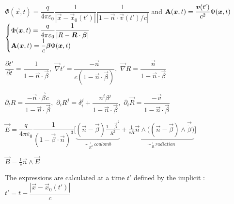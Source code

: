 \item $\Phi(\vec{x},t) = \dfrac{q}{4\pi\varepsilon_0} \dfrac{1}{|\vec{x} - \vec{x}_0(t')|} \dfrac{1}{|1- \vec{n}\cdot\vec{v}(t')/c|}$ and  $\vec{\rm{A}}(\vec{x},t) = \dfrac{\vec{v}(t')}{c^2} \Phi(\vec{x},t)$
\\
$\begin{cases}
\Phi(\vec{x},t) = \dfrac{q}{4\pi\varepsilon_0} \dfrac{1}{|R-\vec{R}\cdot\vec{\beta}|}
\\
\vec{\rm{A}}(\vec{x},t) = \dfrac{1}{c}\vec{\beta} \Phi(\vec{x},t)
\end{cases}$

\item $\dfrac{\partial t'}{\partial t} = \dfrac{1}{1-\vec{n}\cdot\vec{\beta}}, \,\, \vec{\nabla}t' = \dfrac{-\vec{n}}{c(1-\vec{n}\cdot\vec{\beta})}, \,\, \vec{\nabla}R = \dfrac{\vec{n}}{1-\vec{n}\cdot\vec{\beta}}$

\item $\partial_t R = \dfrac{-\vec{n}\cdot\vec{\beta}c}{1-\vec{n}\cdot\vec{\beta}}, \,\, \partial_i R^j = \delta_i^j + \dfrac{n^i\beta^j}{1-\vec{n}\cdot\vec{\beta}}, \,\, \partial_t \vec{R} = \dfrac{-\vec{v}}{1-\vec{n}\cdot\vec{\beta}}$


\item $\vec{E} =  \dfrac{q}{4\pi\varepsilon_0} \dfrac{1}{ (1-\vec{\beta}\cdot\vec{n})^3} \big[\underbrace{(\vec{n} - \vec{\beta})\frac{1-\vec{\beta}^2}{R^2}}_{\sim \frac{1}{R^2} \, coulomb} + \underbrace{\frac{1}{cR}\vec{n}\wedge \big( (\vec{n}-\vec{\beta})\wedge \vec{\dot{\beta}}\big)}_{\sim \frac{1}{R} \, radiation}\big]$
\item $\vec{B} = \frac{1}{c} \vec{n} \wedge \vec{E}$

The expressions are calculated at a time $t'$ defined by the implicit : $t' = t - \dfrac{|\vec{x} - \vec{x}_0(t')|}{c}$%

\squishend


